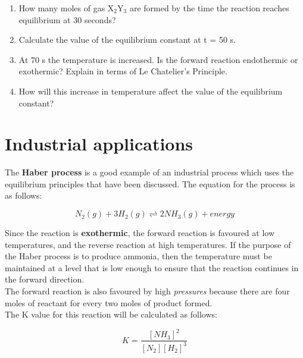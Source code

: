 {\begin{enumerate}
{	\begin{enumerate}
	\item{How many moles of gas X$_{2}$Y$_{3}$ are formed by the time the reaction reaches equilibrium at 30 seconds?}
	\item{Calculate the value of the equilibrium constant at t = 50 s.}
	\item{At 70 s the temperature is increased. Is the forward reaction endothermic or exothermic? Explain in terms of Le Chatelier's Principle.}
	\item{How will this increase in temperature affect the value of the equilibrium constant?}
	\end{enumerate}
}

\end{enumerate}
}







\section{Industrial applications}
\label{sec:reactionrates:industrial}

The \textbf{Haber process} is a good example of an industrial process which uses the equilibrium principles that have been discussed. The equation for the process is as follows:

\begin{equation*}
N_{2}(g) + 3H_{2}(g) \rightleftharpoons 2NH_{3}(g) + energy 
\end{equation*}

Since the reaction is \textbf{exothermic}, the forward reaction is favoured at low temperatures, and the reverse reaction at high temperatures. If the purpose of the Haber process is to produce ammonia, then the temperature must be maintained at a level that is low enough to ensure that the reaction continues in the forward direction.\\

The forward reaction is also favoured by high \textit{pressures} because there are four moles of reactant for every two moles of product formed.\\

The K value for this reaction will be calculated as follows:

\begin{equation*}
K = \frac{[NH_{3}]^{2}}{[N_{2}][H_{2}]^{3}}
\end{equation*}

